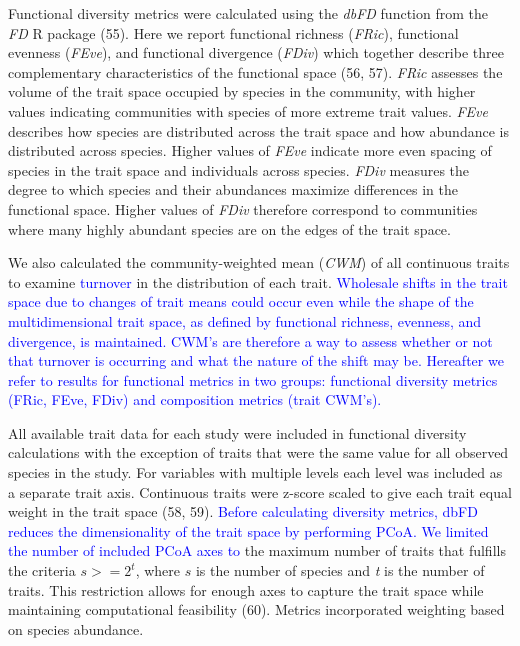 \documentclass{article}
\begin{document}
Functional diversity metrics were calculated using the \emph{dbFD}
function from the \emph{FD} R package (55). Here we report functional
richness (\emph{FRic}), functional evenness (\emph{FEve}), and
functional divergence (\emph{FDiv}) which together describe three
complementary characteristics of the functional space (56, 57).
\emph{FRic} assesses the volume of the trait space occupied by species
in the community, with higher values indicating communities with species
of more extreme trait values. \emph{FEve} describes how species are
distributed across the trait space and how abundance is distributed
across species. Higher values of \emph{FEve} indicate more even spacing
of species in the trait space and individuals across species.
\emph{FDiv} measures the degree to which species and their abundances
maximize differences in the functional space. Higher values of
\emph{FDiv} therefore correspond to communities where many highly
abundant species are on the edges of the trait space.

We also calculated the community-weighted mean (\emph{CWM}) of all
continuous traits to examine \textcolor{blue}{turnover} in the
distribution of each trait.
\textcolor{blue}{Wholesale shifts in the trait space due to changes of trait means could occur even while the shape of the multidimensional trait space, as defined by functional richness, evenness, and divergence, is maintained. CWM's are therefore a way to assess whether or not that turnover is occurring and what the nature of the shift may be. Hereafter we refer to results for functional metrics in two groups: functional diversity metrics (FRic, FEve, FDiv) and composition metrics (trait CWM's).}

All available trait data for each study were included in functional
diversity calculations with the exception of traits that were the same
value for all observed species in the study. For variables with multiple
levels each level was included as a separate trait axis. Continuous
traits were z-score scaled to give each trait equal weight in the trait
space (58, 59).
\textcolor{blue}{Before calculating diversity metrics, dbFD reduces the dimensionality of the trait space by performing PCoA. We limited the number of included PCoA axes to}
the maximum number of traits that fulfills the criteria \(s >= 2^t\),
where \(s\) is the number of species and \emph{t} is the number of
traits. This restriction allows for enough axes to capture the trait
space while maintaining computational feasibility (60). Metrics
incorporated weighting based on species abundance.
\end{document}

